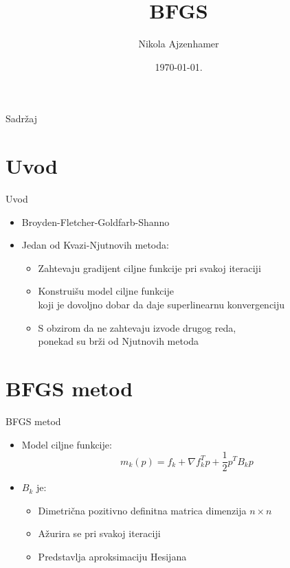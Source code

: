 \documentclass[serbian]{beamer}
\title[BFGS]{BFGS}
\author{Nikola Ajzenhamer}
\institute{Matemati\v cki fakultet, \\ Univerzitet u Beogradu}
\date{\today.}
\begin{document}
\begin{frame}
  	\titlepage
\end{frame}

\begin{frame}{Sadr\v zaj}
  	\tableofcontents
\end{frame}

\section{Uvod}

\begin{frame}{Uvod}

\begin{itemize}
	\item Broyden-Fletcher-Goldfarb-Shanno
	\item Jedan od Kvazi-Njutnovih metoda:
	\begin{itemize}
		\item Zahtevaju gradijent ciljne funkcije pri svakoj iteraciji
		\item Konstrui\v su model ciljne funkcije \\
		koji je dovoljno dobar da daje superlinearnu konvergenciju
		\item S obzirom da ne zahtevaju izvode drugog reda, \\
		ponekad su br\v zi od Njutnovih metoda
	\end{itemize}
\end{itemize}

\end{frame}

\section{BFGS metod}

\begin{frame}{BFGS metod}

\begin{itemize}
	\item Model ciljne funkcije:
	\begin{equation}\label{for:model ciljne funkcije}
		m_k(p) = f_k + \nabla f_k^Tp + \dfrac{1}{2} p^T B_k p
	\end{equation}

	\item $B_k$ je:
	\begin{itemize}
		\item Dimetri\v cna pozitivno definitna matrica dimenzija $n \times n$
		\item A\v zurira se pri svakoj iteraciji
		\item Predstavlja aproksimaciju Hesijana
	\end{itemize}
\end{itemize}

\end{frame}
\end{document}
